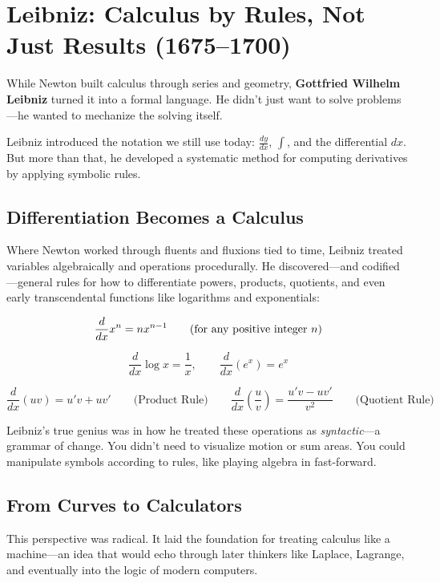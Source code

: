 \section{Leibniz: Calculus by Rules, Not Just Results (1675–1700)}

While Newton built calculus through series and geometry, \textbf{Gottfried Wilhelm Leibniz} turned it into a formal language.  
He didn’t just want to solve problems—he wanted to mechanize the solving itself.

Leibniz introduced the notation we still use today: \( \frac{dy}{dx} \), \( \int \), and the differential \( dx \).  
But more than that, he developed a systematic method for computing derivatives by applying symbolic rules.

\subsection{Differentiation Becomes a Calculus}

Where Newton worked through fluents and fluxions tied to time, Leibniz treated variables algebraically and operations procedurally.  
He discovered—and codified—general rules for how to differentiate powers, products, quotients, and even early transcendental functions like logarithms and exponentials:

\[
\frac{d}{dx} x^n = n x^{n-1} \qquad \text{(for any positive integer \( n \))}
\]

\[
\frac{d}{dx} \log x = \frac{1}{x}, \qquad \frac{d}{dx} (e^x) = e^x
\]

\[
\frac{d}{dx}(uv) = u'v + uv' \qquad \text{(Product Rule)}
\quad\quad
\frac{d}{dx} \left( \frac{u}{v} \right) = \frac{u'v - uv'}{v^2} \qquad \text{(Quotient Rule)}
\]

Leibniz’s true genius was in how he treated these operations as \textit{syntactic}—a grammar of change.  
You didn’t need to visualize motion or sum areas. You could manipulate symbols according to rules, like playing algebra in fast-forward.

\subsection{From Curves to Calculators}

This perspective was radical. It laid the foundation for treating calculus like a machine—an idea that would echo through later thinkers like Laplace, Lagrange, and eventually into the logic of modern computers.

